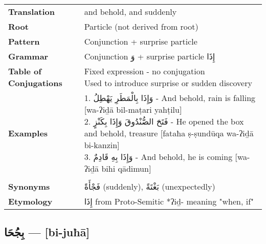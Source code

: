 \documentclass[letter,12pt]{article}
\begin{document}
\begin{tabular}{p{3cm}p{10cm}}
\toprule
\textbf{Translation} & and behold, and suddenly \\
\textbf{Root} & Particle (not derived from root) \\
\textbf{Pattern} & Conjunction + surprise particle \\
\textbf{Grammar} & Conjunction \textarabic{وَ} + surprise particle \textarabic{إِذَا} \\
\textbf{Table of Conjugations} & \makecell[l]{
Fixed expression - no conjugation\\
Used to introduce surprise or sudden discovery
} \\
\textbf{Examples} & \makecell[l]{\parbox{9.5cm}{
1. \textarabic{وَإِذَا بِالْمَطَرِ يَهْطِلُ} - And behold, rain is falling [wa-ʔiḏā bil-maṭari yahṭilu]\\
2. \textarabic{فَتَحَ الصُّنْدُوقَ وَإِذَا بِكَنْزٍ} - He opened the box and behold, treasure [fataħa ṣ-ṣundūqa wa-ʔiḏā bi-kanzin]\\
3. \textarabic{وَإِذَا بِهِ قَادِمٌ} - And behold, he is coming [wa-ʔiḏā bihi qādimun]
}} \\
\midrule \\
\textbf{Synonyms} & \textarabic{فَجْأَةً} (suddenly), \textarabic{بَغْتَةً} (unexpectedly) \\
\textbf{Etymology} & \textarabic{إِذَا} from Proto-Semitic *ʔiḏ- meaning "when, if" \\
\bottomrule
\end{tabular}

\subsection{\textarabic{بِجُحَا} — [bi-juħā]}
\end{document}
